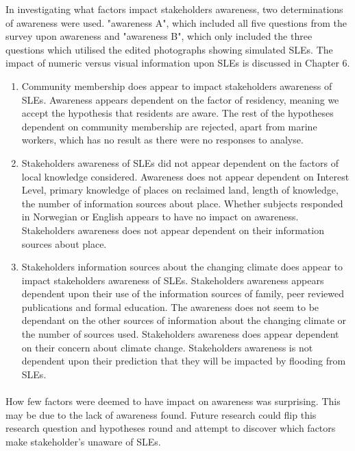 In investigating what factors impact stakeholders awareness, two determinations of awareness were used. "awareness A", which included all five questions from the survey upon awareness and "awareness B", which only included the three questions which utilised the edited photographs showing simulated SLEs. The impact of numeric versus visual information upon SLEs is discussed in Chapter 6.
\begin{enumerate}
    \item Community membership does appear to impact stakeholders awareness of SLEs. Awareness appears dependent on the factor of residency, meaning we accept the hypothesis that residents are aware. The rest of the hypotheses dependent on community membership are rejected, apart from marine workers, which has no result as there were no responses to analyse.
  
    \item Stakeholders awareness of SLEs did not appear dependent on the factors of local knowledge considered. Awareness does not appear dependent on Interest Level, primary knowledge of places on reclaimed land, length of knowledge, the number of information sources about place. Whether subjects responded in Norwegian or English appears to have no impact on awareness. Stakeholders awareness does not appear dependent on their information sources about place. 

    \item  Stakeholders information sources about the changing climate does appear to impact stakeholders awareness of SLEs. Stakeholders awareness appears dependent upon their use of the information sources of family, peer reviewed publications and formal education. The awareness does not seem to be dependant on the other sources of information about the changing climate or the number of sources used. Stakeholders awareness does appear dependent on their concern about climate change. Stakeholders awareness is not dependent upon their prediction that they will be impacted by flooding from SLEs.
\end{enumerate}
\paragraph{}
How few factors were deemed to have impact on awareness was surprising. This may be due to the lack of awareness found.  Future research could flip this research question and hypotheses round and attempt to discover which factors make stakeholder's unaware of SLEs. 








